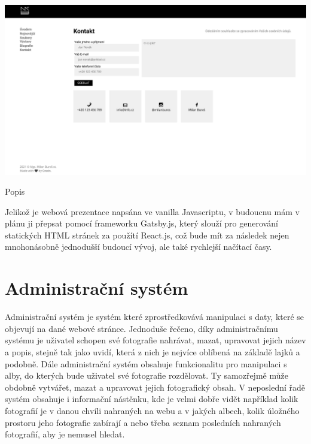 \documentclass[12pt,a4paper]{report}
\begin{document}
  \vspace*{0.5cm}
  \noindent\includegraphics[width=\linewidth]{contact.png}
  \begin{center}
    Popis
  \end{center}
  \vspace*{0.5cm}

  Jelikož je webová prezentace napsána ve vanilla Javascriptu, v budoucnu mám v plánu ji přepsat
  pomocí frameworku Gatsby.js, který slouží pro generování statických HTML stránek za použítí
  React.js, což bude mít za následek nejen mnohonásobně jednodušší budoucí vývoj, ale také
  rychlejší načítací časy.

  \chapter{Administrační systém}
 
  Administrační systém je systém které zprostředkovává manipulaci s daty, které se objevují na
  dané webové stránce. Jednoduše řečeno, díky administračnímu systému je uživatel schopen své
  fotografie nahrávat, mazat, upravovat jejich název a popis, stejně tak jako uvidí, která z nich je
  nejvíce oblíbená na základě lajků a podobně. Dále administrační systém obsahuje funkcionalitu
  pro manipulaci s alby, do kterých bude uživatel své fotografie rozdělovat. Ty samozřejmě může
  obdobně vytvářet, mazat a upravovat jejich fotografický obsah. V neposlední řadě systém
  obsahuje i informační nástěnku, kde je velmi dobře vidět například kolik fotografií je v danou chvíli
  nahraných na webu a v jakých albech, kolik úložného prostoru jeho fotografie zabírají a nebo
  třeba seznam posledních nahraných fotografií, aby je nemusel hledat.
\end{document}
